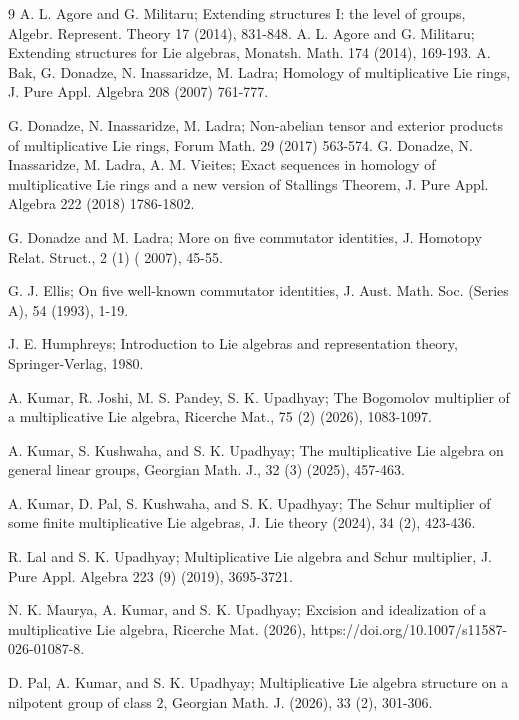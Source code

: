 \documentclass[10 pt,oneside,reqno,a4paper]{amsart}
\numberwithin{equation}{section}
\begin{document}
\begin{thebibliography}{9}
      A. L. Agore and G. Militaru; Extending structures I: the level of groups, Algebr. Represent. Theory 17 (2014), 831-848.
      A. L. Agore and G. Militaru; Extending structures for Lie algebras, Monatsh. Math. 174 (2014), 169-193.
     A. Bak, G. Donadze, N. Inassaridze, M. Ladra; Homology of multiplicative Lie rings, J. Pure Appl. Algebra 208 (2007) 761-777.

    
     G. Donadze, N. Inassaridze, M. Ladra; Non-abelian tensor and exterior products of multiplicative Lie rings, Forum Math. 29 (2017) 563-574.
     G. Donadze, N. Inassaridze, M. Ladra, A. M. Vieites; Exact sequences in homology of multiplicative Lie rings and a new version of Stallings Theorem, J. Pure Appl. Algebra 222 (2018) 1786-1802.

G. Donadze and M. Ladra;
More on five commutator identities, {J. Homotopy Relat. Struct.},  2 (1) ( 2007), 45-55.
    
	G. J. Ellis; On five well-known commutator identities, J. Aust. Math. Soc. (Series A), 54 (1993), 1-19.

J. E. Humphreys; Introduction to Lie algebras and representation theory, Springer-Verlag, 1980.

 A. Kumar, R. Joshi, M. S. Pandey, S. K. Upadhyay; The Bogomolov multiplier of a multiplicative Lie algebra, Ricerche Mat., 75 (2) (2026), 1083-1097.

     A. Kumar, S. Kushwaha, and S. K. Upadhyay; The multiplicative Lie algebra on general linear groups, Georgian Math. J., 32 (3) (2025), 457-463. 

     A. Kumar, D. Pal,  S. Kushwaha, and S. K. Upadhyay; {The Schur multiplier of some finite multiplicative Lie algebras}, J. Lie theory (2024), 34 (2), 423-436.

 R. Lal and S. K. Upadhyay; Multiplicative Lie algebra and Schur multiplier, J. Pure Appl. Algebra 223 (9) (2019), 3695-3721.

 N. K. Maurya, A. Kumar, and S. K. Upadhyay; {Excision and idealization of a multiplicative Lie algebra}, Ricerche Mat. (2026), https://doi.org/10.1007/s11587-026-01087-8.

 D. Pal, A. Kumar, and S. K. Upadhyay;  {Multiplicative Lie algebra structure on a nilpotent group of class $2$}, Georgian Math. J. (2026), 33 (2), 301-306.


\end{thebibliography}
\end{document}
